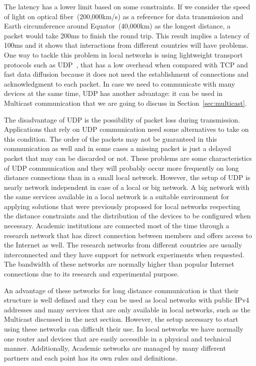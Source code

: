 The latency has a lower limit based on some constraints.
If we consider the speed of light on optical fiber~(200,000km/s) as a reference for data transmission and Earth circumference around Equator~(40,000km) as the longest distance, a packet would take 200ms to finish the round trip.
This result implies a latency of 100ms and it shows that interactions from different countries will have problems.
One way to tackle this problem in local networks is using lightweight transport protocols such as UDP~\citep{Harker2008laptop,Caceres2010jacktrip}, that has a low overhead when compared with TCP and fast data diffusion because it does not need the establishment of connections and acknowledgment to each packet.
In case we need to communicate with many devices at the same time, UDP has another advantage: it can be used in Multicast communication that we are going to discuss in Section~\ref{sec:multicast}.   

The disadvantage of UDP is the possibility of packet loss during transmission.
Applications that rely on UDP communication need some alternatives to take on this condition.
The order of the packets may not be guaranteed in this communication as well and in some cases a missing packet is just a delayed packet that may can be discarded or not.
These problems are some characteristics of UDP communication and they will probably occur more frequently on long distance connections than in a small local network.
However, the setup of UDP is nearly network independent in case of a local or big network.
A big network with the same services available in a local network is a suitable environment for applying solutions that were previously proposed for local networks respecting the distance constraints and the distribution of the devices to be configured when necessary.
Academic institutions are connected most of the time through a research network that has direct connection between members and offers access to the Internet as well.
The research networks from different countries are usually interconnected and they have support for network experiments when requested.
The bandwidth of these networks are normally higher than popular Internet connections due to its research and experimental purpose.

An advantage of these networks for long distance communication is that their structure is well defined and they can be used as local networks with public IPv4 addresses and many services that are only available in local networks, such as the Multicast discussed in the next section.
However, the setup necessary to start using these networks can difficult their use.
In local networks we have normally one router and devices that are easily accessible in a physical and technical manner.
Additionally, Academic networks are managed by many different partners and each point has its own rules and definitions.

